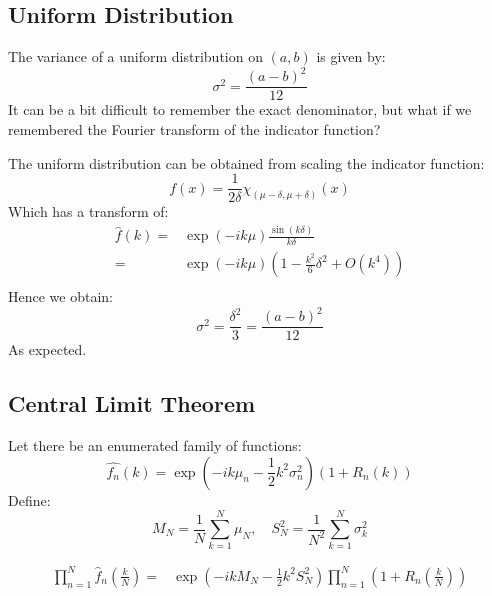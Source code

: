 \documentclass[12pt]{report}
\begin{document}
\subsection{Uniform Distribution}
The variance of a uniform distribution on $(a,b)$ is given by:
\[\sigma^2 = \frac{(a-b)^2}{12}\]
It can be a bit difficult to remember the exact denominator, but what if we remembered the Fourier transform of the indicator function?

The uniform distribution can be obtained from scaling the indicator function:
\[f(x) = \frac{1}{2\delta}\chi_{(\mu-\delta,\mu+\delta)}(x)\]
Which has a transform of:
\begin{equation*}
\begin{aligned}
\hat{f}(k) =& \exp(-ik\mu)\frac{\sin(k\delta)}{k\delta}\\ 
=& \exp(-ik\mu)\left(1-\frac{k^2}{6}\delta^2+ O(k^4)\right)\\ 
\end{aligned}
\end{equation*}
Hence we obtain:
\[\sigma^2 =\frac{\delta^2}{3} = \frac{(a-b)^2}{12}\]
As expected.

\subsection{Central Limit Theorem}
Let there be an enumerated family of functions:
\[\hat{f_n}(k) = \exp\left(-ik\mu_n-\frac{1}{2}k^2\sigma^2_n\right)(1+R_n(k))\]
Define:
\[M_N = \frac{1}{N}\sum_{k=1}^{N}\mu_N,\quad S_N^2 = \frac{1}{N^2}\sum_{k=1}^{N}\sigma^2_k\]

\begin{equation*}
\begin{aligned}
\prod_{n=1}^N\hat{f}_n\left(\frac{k}{N}\right) =&\exp\left(-ikM_N-\frac{1}{2}k^2S^2_N\right)\prod_{n=1}^{N}\left(1+R_n\left(\frac{k}{N}\right)\right) \\
\end{aligned}
\end{equation*}
\end{document}
